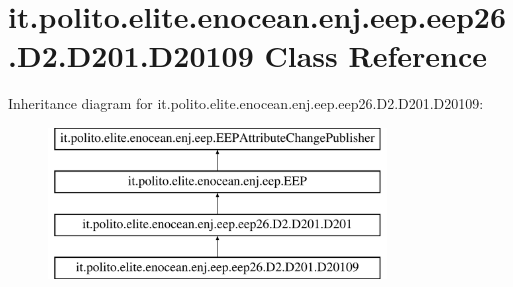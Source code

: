 \hypertarget{classit_1_1polito_1_1elite_1_1enocean_1_1enj_1_1eep_1_1eep26_1_1_d2_1_1_d201_1_1_d20109}{}\section{it.\+polito.\+elite.\+enocean.\+enj.\+eep.\+eep26.\+D2.\+D201.\+D20109 Class Reference}
\label{classit_1_1polito_1_1elite_1_1enocean_1_1enj_1_1eep_1_1eep26_1_1_d2_1_1_d201_1_1_d20109}
Inheritance diagram for it.\+polito.\+elite.\+enocean.\+enj.\+eep.\+eep26.\+D2.\+D201.\+D20109\+:\begin{figure}[H]
\begin{center}
\leavevmode
\includegraphics[height=4.000000cm]{classit_1_1polito_1_1elite_1_1enocean_1_1enj_1_1eep_1_1eep26_1_1_d2_1_1_d201_1_1_d20109}
\end{center}
\end{figure}
